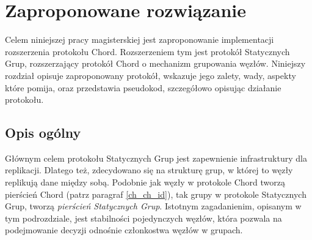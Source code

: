 \documentclass[12pt, twoside, openany]{report}
\begin{document}
\chapter{Zaproponowane rozwiązanie}
\label{rozdzial_rozwiazanie}
Celem niniejszej pracy magisterskiej jest zaproponowanie implementacji rozszerzenia protokołu Chord. Rozszerzeniem tym jest protokół Statycznych Grup, rozszerzający protokół Chord o mechanizm grupowania węzłów. Niniejszy rozdział opisuje zaproponowany protokół, wskazuje jego zalety, wady, aspekty które pomija, oraz przedstawia pseudokod, szczegółowo opisując działanie protokołu.

\section{Opis ogólny}
Głównym celem protokołu Statycznych Grup jest zapewnienie infrastruktury dla replikacji. Dlatego też, zdecydowano się na strukturę grup, w której to węzły replikują dane między sobą. Podobnie jak węzły w protokole Chord tworzą pierścień Chord (patrz paragraf \ref{ch_ch_id}), tak grupy w protokole Statycznych Grup, tworzą \textit{pierścień Statycznych Grup}. Istotnym zagadanienim, opisanym w tym podrozdziale, jest stabilności pojedynczych węzłów, która pozwala na podejmowanie decyzji odnośnie członkostwa węzłów w grupach.
\end{document}
